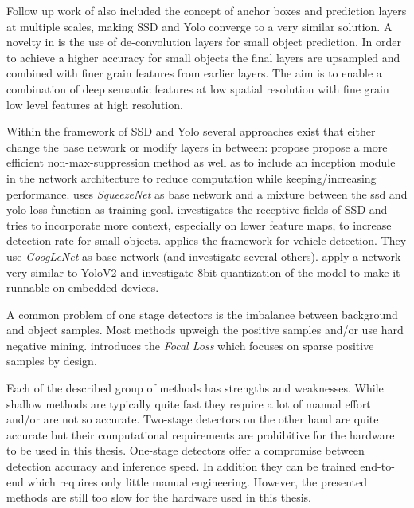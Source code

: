 Follow up work of \citeauthor{Redmon}\cite{Redmon, Redmona} also included the concept of anchor boxes and prediction layers at multiple scales, making \ac{SSD} and \ac{Yolo} converge to a very similar solution. A novelty in \cite{Redmona} is the use of de-convolution layers for small object prediction. In order to achieve a higher accuracy for small objects the final layers are upsampled and combined with finer grain features from earlier layers. The aim is to enable a combination of deep semantic features at low spatial resolution with fine grain low level features at high resolution.

Within the framework of \ac{SSD} and \ac{Yolo} several approaches exist that either change the base network or modify layers in between: \cite{ChengchengNing2017} propose propose a more efficient non-max-suppression method as well as to include an inception module in the network architecture to reduce computation while keeping/increasing performance. \cite{Wu} uses \textit{SqueezeNet} as base network and a mixture between the ssd and yolo loss function as training goal. \cite{Xiang} investigates the receptive fields of SSD and tries to incorporate more context, especially on lower feature maps, to increase detection rate for small objects.\cite{Linb} applies the framework for vehicle detection. They use \textit{GoogLeNet} as base network (and investigate several others).\cite{TripathiSanDiego} apply a network very similar to YoloV2 and investigate 8bit quantization of the model to make it runnable on embedded devices.

A common problem of one stage detectors is the imbalance between background and object samples. Most methods upweigh the positive samples and/or use hard negative mining. \cite{Lin} introduces the \textit{Focal Loss} which focuses on sparse positive samples by design.



Each of the described group of methods has strengths and weaknesses. While shallow methods are typically quite fast they require a lot of manual effort and/or are not so accurate. Two-stage detectors on the other hand are quite accurate but their computational requirements are prohibitive for the hardware to be used in this thesis. One-stage detectors offer a compromise between detection accuracy and inference speed. In addition they can be trained end-to-end which requires only little manual engineering. However, the presented methods are still too slow for the hardware used in this thesis.


